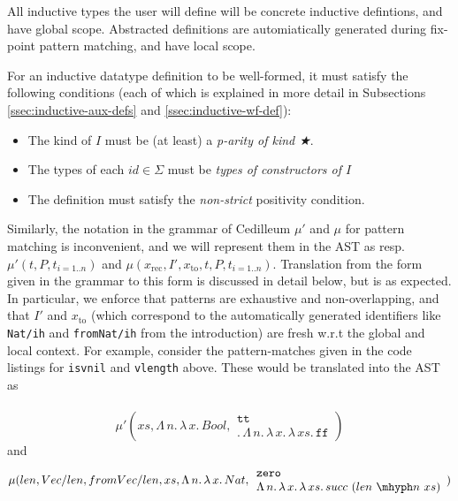 \documentclass{article}
\newcommand{\absu}[3]{{#1}\, #2.\, #3}
\begin{document}
\noindent All inductive types the user will define will be concrete inductive
defintions, and have global scope. Abstracted definitions are automiatically
generated during fix-point pattern matching, and have local scope.

For an inductive datatype definition to be well-formed, it must satisfy the
following conditions (each of which is explained in more detail in Subsections
\ref{ssec:inductive-aux-defs} and \ref{ssec:inductive-wf-def}):

\begin{itemize}
\item The kind of $I$ must be (at least) a \textit{p-arity of kind ★}.
\item The types of each $id \in \Sigma$ must be \textit{types of constructors
    of $I$}
\item The definition must satisfy the \textit{non-strict} positivity condition.
\end{itemize}

Similarly, the notation in the grammar of Cedilleum $\mu'$ and $\mu$ for pattern
matching is inconvenient, and we will represent them in the AST as resp.
$\mu'(t,P,t_{i=1..n})$ and
$\mu(x_{\text{rec}},I',x_{\text{to}},t,P,t_{i=1..n})$. Translation from the form
given in the grammar to this form is discussed in detail below, but is as
expected. In particular, we enforce that patterns are exhaustive and
non-overlapping, and that $I'$ and $x_{\text{to}}$ (which correspond to the
automatically generated identifiers like \texttt{Nat/ih} and \texttt{fromNat/ih}
from the introduction) are fresh w.r.t the global and local
context. For example, consider the pattern-matches given in the code listings
for \texttt{isvnil} and \texttt{vlength} above. These would be translated into
the AST as
\\ \\
\[
  \mu'(xs,\absu{\Lambda}{n}{\absu{\lambda}{x}{Bool}},
  \begin{array}{l}
    \absu{\texttt{tt}}
    \\ \absu{\Lambda}{n}{\absu{\lambda}{x}{\absu{\lambda}{xs}{\texttt{ff}}}}
  \end{array}
  )
\] and
\[ \mu(len, Vec/len, fromVec/len,xs,\absu{\Lambda}{n}{\absu{\lambda}{x}{Nat}},
  \begin{array}{l}
    \texttt{zero}
    \\ \absu{\Lambda}{n}{\absu{\lambda}{x}{\absu{\lambda}{xs}{succ\ (len\ \mhyph
    n\ xs)}}}
  \end{array})
\]
\end{document}
